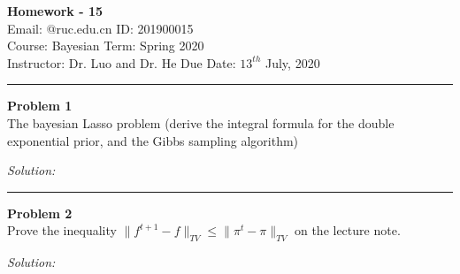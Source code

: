 \documentclass[a4paper, 11pt]{article}
\newenvironment{problem}[2][Problem]
    { \begin{mdframed}[backgroundcolor=gray!20] \textbf{#1 #2} \\}
    {  \end{mdframed}}
\newenvironment{solution}
    {\textit{Solution:}}
    {}
\begin{document}
\noindent
\large\textbf{} \hfill \textbf{Homework - 15}   \\
Email: @ruc.edu.cn \hfill ID: 201900015 \\
\normalsize Course: Bayesian \hfill Term: Spring 2020\\
Instructor: Dr. Luo and Dr. He  \hfill Due Date: $13^{th}$ July, 2020 \\
\noindent\rule{7in}{2.8pt}

\begin{problem}{1}
	 The bayesian Lasso problem (derive the integral formula for the double exponential prior, and the Gibbs sampling algorithm)
\end{problem}
\begin{solution}



\end{solution}

\noindent\rule{7in}{2.8pt}
\begin{problem}{2}
	Prove the inequality $\| f^{t+1} - f\|_{TV} \le \| \pi^t -\pi\|_{TV}$ on the lecture note.
\end{problem}
\begin{solution}


	
\end{solution}
\end{document}
